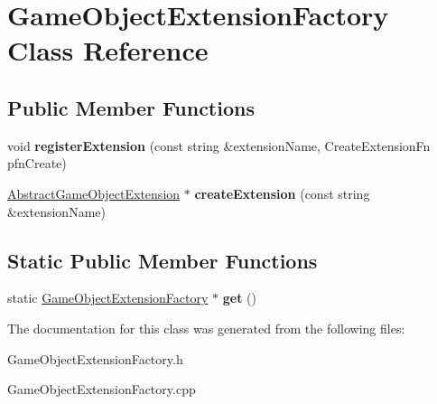 \hypertarget{class_game_object_extension_factory}{}\section{Game\+Object\+Extension\+Factory Class Reference}
\label{class_game_object_extension_factory}
\subsection*{Public Member Functions}
\begin{DoxyCompactItemize}
\item 
\mbox{\label{class_game_object_extension_factory_ab9c2ed400c2ff14bb6fcb1e7bf7331e5}} 
void {\bfseries register\+Extension} (const string \&extension\+Name, Create\+Extension\+Fn pfn\+Create)
\item 
\mbox{\label{class_game_object_extension_factory_af55575f9463d72d29493247e194d85b8}} 
\mbox{\hyperlink{class_abstract_game_object_extension}{Abstract\+Game\+Object\+Extension}} $\ast$ {\bfseries create\+Extension} (const string \&extension\+Name)
\end{DoxyCompactItemize}
\subsection*{Static Public Member Functions}
\begin{DoxyCompactItemize}
\item 
\mbox{\label{class_game_object_extension_factory_a986654c9c23115ed7f8a5c0e43571b54}} 
static \mbox{\hyperlink{class_game_object_extension_factory}{Game\+Object\+Extension\+Factory}} $\ast$ {\bfseries get} ()
\end{DoxyCompactItemize}


The documentation for this class was generated from the following files\+:\begin{DoxyCompactItemize}
\item 
Game\+Object\+Extension\+Factory.\+h\item 
Game\+Object\+Extension\+Factory.\+cpp\end{DoxyCompactItemize}

